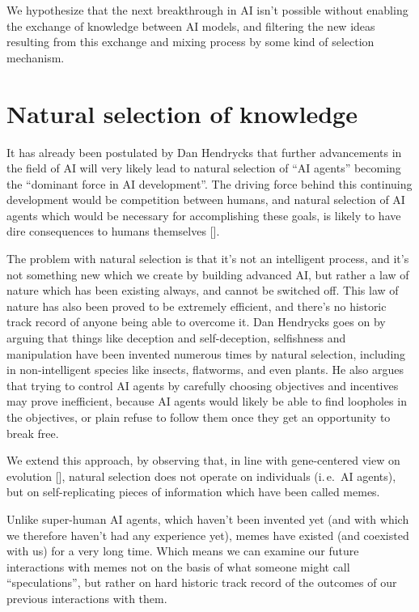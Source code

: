 \documentclass[12pt]{article}
\newcommand{\citestrut}[1]{\vphantom{[}{#1}\vphantom{]}}
\renewcommand{\cite}[1]{[\hyperlink{#1}{\citestrut{#1}}]}
\begin{document}
We hypothesize that the next breakthrough in AI isn't possible without enabling the
exchange of knowledge between AI models, and filtering the new ideas resulting from this
exchange and mixing process by some kind of selection mechanism.

\section{Natural selection of knowledge}

It has already been postulated by Dan Hendrycks that further advancements in the field of
AI will very likely lead to natural selection of ``AI agents'' becoming the ``dominant
force in AI development''. The driving force behind this continuing development would be
competition between humans, and natural selection of AI agents which would be necessary
for accomplishing these goals, is likely to have dire consequences to humans themselves
\cite{NaturalSelection}.

The problem with natural selection is that it's not an intelligent process, and it's not
something new which we create by building advanced AI, but rather a law of nature which
has been existing always, and cannot be switched off. This law of nature has also been
proved to be extremely efficient, and there's no historic track record of anyone being
able to overcome it. Dan Hendrycks goes on by arguing that things like deception and
self-deception, selfishness and manipulation have been invented numerous times by natural
selection, including in non-intelligent species like insects, flatworms, and even plants.
He also argues that trying to control AI agents by carefully choosing objectives and
incentives may prove inefficient, because AI agents would likely be able to find
loopholes in the objectives, or plain refuse to follow them once they get an opportunity
to break free.

We extend this approach, by observing that, in line with gene-centered view on evolution
\cite{GenesFirst}, natural selection does not operate on individuals (i.\,e.\ AI agents),
but on self-replicating pieces of information which have been called memes.

Unlike super-human AI agents, which haven't been invented yet (and with which we
therefore haven't had any experience yet), memes have existed (and coexisted with us) for
a very long time. Which means we can examine our future interactions with memes not on
the basis of what someone might call ``speculations'', but rather on hard historic track
record of the outcomes of our previous interactions with them.
\end{document}
